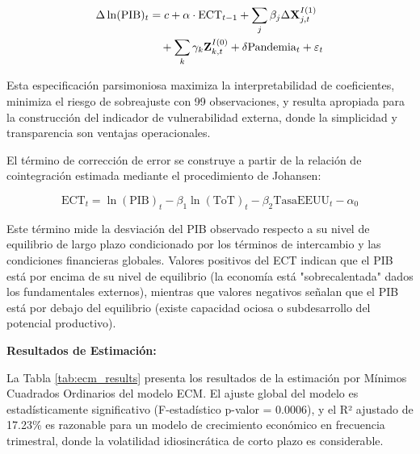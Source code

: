 \documentclass[3p,11pt]{elsarticle}
\begin{document}
\begin{align}
\Delta \ln(\text{PIB})_{t} &= c + \alpha \cdot \text{ECT}_{t-1} + \sum_{j} \beta_j \Delta \mathbf{X}_{j,t}^{I(1)} \notag \\
&\quad + \sum_{k} \gamma_k \mathbf{Z}_{k,t}^{I(0)} + \delta \text{Pandemia}_{t} + \varepsilon_{t}
\end{align}

Esta especificación parsimoniosa maximiza la interpretabilidad de coeficientes, minimiza el riesgo de sobreajuste con 99 observaciones, y resulta apropiada para la construcción del indicador de vulnerabilidad externa, donde la simplicidad y transparencia son ventajas operacionales.

El término de corrección de error se construye a partir de la relación de cointegración estimada mediante el procedimiento de Johansen:

\begin{equation}
\text{ECT}_{t} = \ln(\text{PIB})_{t} - \beta_1 \ln(\text{ToT})_{t} - \beta_2 \text{TasaEEUU}_{t} - \alpha_0
\end{equation}

Este término mide la desviación del PIB observado respecto a su nivel de equilibrio de largo plazo condicionado por los términos de intercambio y las condiciones financieras globales. Valores positivos del ECT indican que el PIB está por encima de su nivel de equilibrio (la economía está "sobrecalentada" dados los fundamentales externos), mientras que valores negativos señalan que el PIB está por debajo del equilibrio (existe capacidad ociosa o subdesarrollo del potencial productivo).

\textbf{Resultados de Estimación:}

La Tabla \ref{tab:ecm_results} presenta los resultados de la estimación por Mínimos Cuadrados Ordinarios del modelo ECM. El ajuste global del modelo es estadísticamente significativo (F-estadístico p-valor = 0.0006), y el R² ajustado de 17.23\% es razonable para un modelo de crecimiento económico en frecuencia trimestral, donde la volatilidad idiosincrática de corto plazo es considerable.
\end{document}
